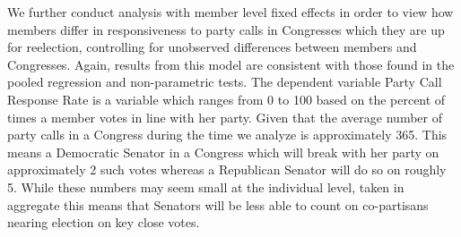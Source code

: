 \documentclass[12pt]{article}
\begin{document}
We further conduct analysis with member level fixed effects in order to view how members differ in responsiveness to party calls in Congresses which they are up for reelection, controlling for unobserved differences between members and Congresses. Again, results from this model are consistent with those found in the pooled regression and non-parametric tests. The dependent variable Party Call Response Rate is a variable which ranges from 0 to 100 based on the percent of times a member votes in line with her party. Given that the average number of party calls in a Congress during the time we analyze is approximately 365. This means a Democratic Senator in a Congress which will break with her party on approximately 2 such votes whereas a Republican Senator will do so on roughly 5. While these numbers may seem small at the individual level, taken in aggregate this means that Senators will be less able to count on co-partisans nearing election on key close votes.
\end{document}
